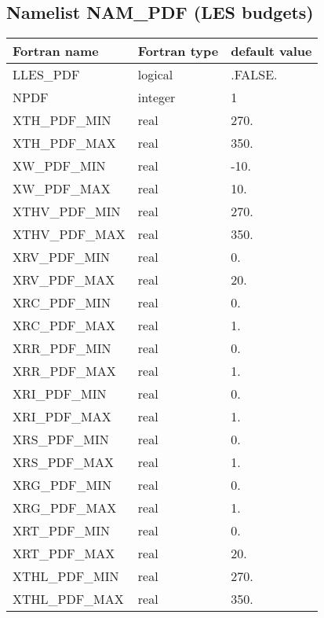 \subsection{Namelist NAM\_PDF (LES budgets) }                                
\begin{longtable} {|p{}|p{}|p{}|}
\hline
Fortran name &  Fortran type & default value \\
\hline 
\endhead
\hline
\endfoot
LLES\_PDF                     & logical          & .FALSE.  \\
NPDF                          & integer           & 1 \\
XTH\_PDF\_MIN                 & real              & 270. \\
XTH\_PDF\_MAX                 & real              & 350. \\
XW\_PDF\_MIN                  & real              & -10. \\
XW\_PDF\_MAX                  & real              & 10. \\
XTHV\_PDF\_MIN                & real              & 270. \\
XTHV\_PDF\_MAX                & real              & 350. \\
XRV\_PDF\_MIN                 & real              & 0. \\
XRV\_PDF\_MAX                 & real              & 20. \\
XRC\_PDF\_MIN                 & real              & 0. \\
XRC\_PDF\_MAX                 & real              & 1. \\
XRR\_PDF\_MIN                 & real              & 0. \\
XRR\_PDF\_MAX                 & real              & 1. \\
XRI\_PDF\_MIN                 & real              & 0. \\
XRI\_PDF\_MAX                 & real              & 1. \\
XRS\_PDF\_MIN                 & real              & 0. \\
XRS\_PDF\_MAX                 & real              & 1. \\
XRG\_PDF\_MIN                 & real              & 0. \\
XRG\_PDF\_MAX                 & real              & 1. \\
XRT\_PDF\_MIN                 & real              & 0. \\
XRT\_PDF\_MAX                 & real              & 20. \\
XTHL\_PDF\_MIN                & real              & 270. \\
XTHL\_PDF\_MAX                & real              & 350. \\
\end{longtable}


